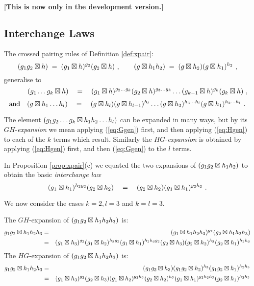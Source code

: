 \noindent
{\bf [This is now only in the development version.]}

\bigskip

\subsection{Interchange Laws} \label{subs:intlaw}

The crossed pairing rules of Definition \ref{def:xpair}:
$$
(g_1g_2 \boxtimes h) \;=\; 
(g_1 \boxtimes h)^{g_2} (g_2 \boxtimes h)~,
\qquad
(g \boxtimes h_1h_2) \;=\;
(g \boxtimes h_2)   (g \boxtimes h_1)^{h_2}~,
$$
generalise to
\begin{equation}\label{eq:Ggen}
\qquad\quad
(g_1 \ldots g_{k}\boxtimes h) \quad=\quad 
 (g_1 \boxtimes h)^{g_2 \ldots g_{k}}   
  (g_2 \boxtimes h)^{g_{3} \ldots g_{k}} \ldots 
   (g_{k-1}\boxtimes h)^{g_{k}}   (g_{k}\boxtimes h)~,
\end{equation}
\begin{equation}\label{eq:Hgen}
\mbox{and}\quad
(g \boxtimes h_1 \ldots h_{l}) \quad=\quad (g \boxtimes h_{l})  
 (g \boxtimes h_{l-1})^{h_{l}} \ldots (g \boxtimes h_2)^{h_{3} \ldots h_{l}}
  (g \boxtimes h_1)^{h_2 \ldots h_{l}}~.
\end{equation}

\medskip
The element  $(g_1 g_2 \ldots g_k \boxtimes h_1 h_2 \ldots h_{l})$
can be expanded in many ways, but by its $GH$-\emph{expansion}
we mean applying (\ref{eq:Ggen}) first,
and then applying (\ref{eq:Hgen}) to each of the  $k$  terms which result.
Similarly the $HG$-\emph{expansion} is obtained by
applying (\ref{eq:Hgen}) first, and then (\ref{eq:Ggen}) to the $l$ terms.

In Proposition \ref{prop:xpair}(c) we equated the two expansions of  
$(g_1g_2 \boxtimes h_1h_2)$  
to obtain the basic \emph{interchange law}
\begin{equation}
(g_1 \boxtimes h_1)^{h_2g_2}(g_2 \boxtimes h_2)
\quad=\quad 
(g_2 \boxtimes h_2)(g_1 \boxtimes h_1)^{g_2h_2}~.
\end{equation}

We now consider the cases  $k=2, l=3$  and  $k=l=3$.

\vspace{2mm}\noindent
The $GH$-expansion of $(g_1g_2 \boxtimes h_1h_2h_{3})$ is:
\begin{eqnarray*}
         g_1g_2 \boxtimes h_1h_2h_{3} 
  & = &  (g_1 \boxtimes h_1h_2h_{3})^{g_2}   
          (g_2 \boxtimes h_1h_2h_{3}) \\
  & = &  (g_1 \boxtimes h_{3})^{g_2}   (g_1 \boxtimes h_2)^{h_{3}g_2} 
          (g_1 \boxtimes h_1)^{h_2h_{3}g_2} (g_2 \boxtimes h_{3}) (g_2 \boxtimes h_2)^{h_{3}} 
           (g_2 \boxtimes h_1)^{h_2h_{3}}
\end{eqnarray*}
The $HG$-expansion of  $(g_1g_2 \boxtimes h_1h_2h_{3})$ is:
\begin{eqnarray*}
g_1g_2 \boxtimes h_1h_2h_{3}  
  & = &  (g_1g_2 \boxtimes h_{3})   (g_1g_2 \boxtimes h_2)^{h_{3}} 
          (g_1g_2 \boxtimes h_1)^{h_2h_{3}} \\  
  & = &  (g_1 \boxtimes h_{3})^{g_2} (g_2 \boxtimes h_{3}) (g_1 \boxtimes h_2)^{g_2h_{3}}
           (g_2 \boxtimes h_2)^{h_{3}} (g_1 \boxtimes h_1)^{g_2h_2h_{3}} 
             (g_2 \boxtimes h_1)^{h_2h_{3}}
\end{eqnarray*}

